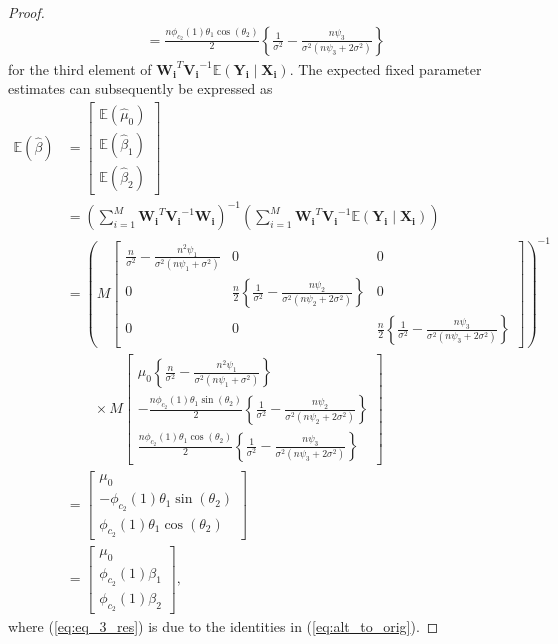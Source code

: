 \begin{proof}
\begin{align*}
    &= \frac{n\phi_{c_2}(1)\theta_1\cos(\theta_2)}{2}\left\{\frac{1}{\sigma^2} - \frac{n\psi_3}{\sigma^2(n\psi_3+2\sigma^2)}\right\}
\end{align*}
for the third element of $\boldsymbol{W_i}^T\boldsymbol{V_i}^{-1}\mathbb{E}(\boldsymbol{Y_i}\mid \boldsymbol{X_i})$. The expected fixed parameter estimates can subsequently be expressed as
\begin{align}
    \mathbb{E}(\hat{\beta}) &= \begin{bmatrix}
    \mathbb{E}(\hat{\mu}_0) \\
    \mathbb{E}(\hat{\beta}_1) \\
    \mathbb{E}(\hat{\beta}_2)
    \end{bmatrix} \nonumber \\
    &= \left(\sum_{i=1}^M\boldsymbol{W_i}^T\boldsymbol{V_i}^{-1}\boldsymbol{W_i}\right)^{-1} \left(\sum_{i=1}^M\boldsymbol{W_i}^T\boldsymbol{V_i}^{-1}\mathbb{E}(\boldsymbol{Y_i} \mid \boldsymbol{X_i})\right) \nonumber \\
    &= \left(M\begin{bmatrix}\frac{n}{\sigma^2} - \frac{n^2\psi_1}{\sigma^2(n\psi_1+\sigma^2)} & 0 & 0 \\
    0 & \frac{n}{2}\left\{\frac{1}{\sigma^2} - \frac{n\psi_2}{\sigma^2(n\psi_2+2\sigma^2)}\right\} & 0 \\
    0 & 0 & \frac{n}{2}\left\{\frac{1}{\sigma^2} - \frac{n\psi_3}{\sigma^2(n\psi_3+2\sigma^2)}\right\}  \end{bmatrix}\right)^{-1} 
\nonumber \\
& \quad \quad \times M\begin{bmatrix} \mu_0\left\{\frac{n}{\sigma^2} - \frac{n^2\psi_1}{\sigma^2(n\psi_1+\sigma^2)}\right\}   \\
  -\frac{n\phi_{c_2}(1)\theta_1\sin(\theta_2)}{2}\left\{\frac{1}{\sigma^2} - \frac{n\psi_2}{\sigma^2(n\psi_2+2\sigma^2)}\right\} \\
 \frac{n\phi_{c_2}(1)\theta_1\cos(\theta_2)}{2}\left\{\frac{1}{\sigma^2} - \frac{n\psi_3}{\sigma^2(n\psi_3+2\sigma^2)}\right\}
\end{bmatrix} \nonumber \\
    &= \begin{bmatrix}
    \mu_0 \\
    -\phi_{c_2}(1)\theta_1\sin(\theta_2) \\
    \phi_{c_2}(1)\theta_1\cos(\theta_2)
    \end{bmatrix} \nonumber \\
    &= \begin{bmatrix}
    \mu_0 \\
    \phi_{c_2}(1)\beta_1 \\
    \phi_{c_2}(1)\beta_2
    \end{bmatrix}, \label{eq:eq_3_res}
\end{align}
where (\ref{eq:eq_3_res}) is due to the identities in (\ref{eq:alt_to_orig}).


\end{proof}
